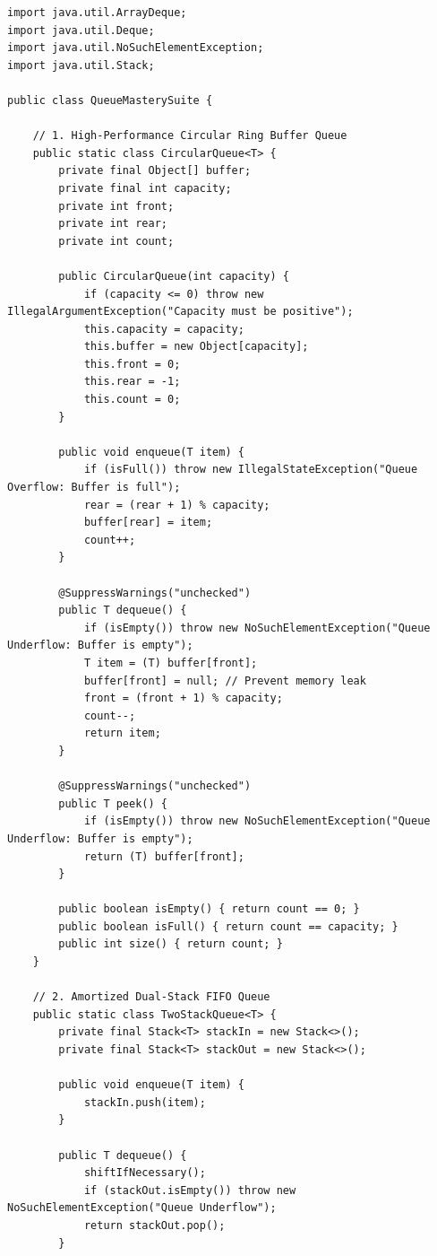 \documentclass[10pt,journal,compsoc,onecolumn]{IEEEtran}
\begin{document}
\begin{verbatim}
import java.util.ArrayDeque;
import java.util.Deque;
import java.util.NoSuchElementException;
import java.util.Stack;

public class QueueMasterySuite {

    // 1. High-Performance Circular Ring Buffer Queue
    public static class CircularQueue<T> {
        private final Object[] buffer;
        private final int capacity;
        private int front;
        private int rear;
        private int count;

        public CircularQueue(int capacity) {
            if (capacity <= 0) throw new IllegalArgumentException("Capacity must be positive");
            this.capacity = capacity;
            this.buffer = new Object[capacity];
            this.front = 0;
            this.rear = -1;
            this.count = 0;
        }

        public void enqueue(T item) {
            if (isFull()) throw new IllegalStateException("Queue Overflow: Buffer is full");
            rear = (rear + 1) % capacity;
            buffer[rear] = item;
            count++;
        }

        @SuppressWarnings("unchecked")
        public T dequeue() {
            if (isEmpty()) throw new NoSuchElementException("Queue Underflow: Buffer is empty");
            T item = (T) buffer[front];
            buffer[front] = null; // Prevent memory leak
            front = (front + 1) % capacity;
            count--;
            return item;
        }

        @SuppressWarnings("unchecked")
        public T peek() {
            if (isEmpty()) throw new NoSuchElementException("Queue Underflow: Buffer is empty");
            return (T) buffer[front];
        }

        public boolean isEmpty() { return count == 0; }
        public boolean isFull() { return count == capacity; }
        public int size() { return count; }
    }

    // 2. Amortized Dual-Stack FIFO Queue
    public static class TwoStackQueue<T> {
        private final Stack<T> stackIn = new Stack<>();
        private final Stack<T> stackOut = new Stack<>();

        public void enqueue(T item) {
            stackIn.push(item);
        }

        public T dequeue() {
            shiftIfNecessary();
            if (stackOut.isEmpty()) throw new NoSuchElementException("Queue Underflow");
            return stackOut.pop();
        }


\end{verbatim}
\end{document}
